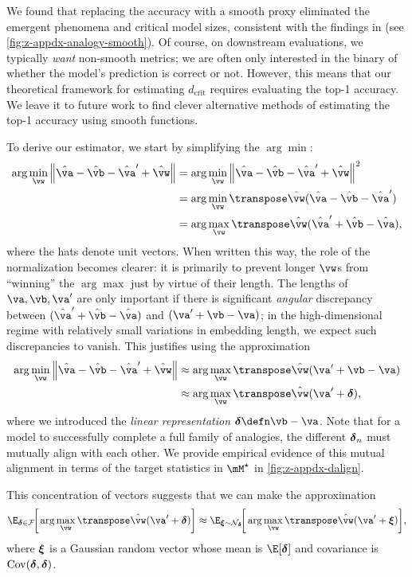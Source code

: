 We found that replacing the accuracy with a smooth proxy eliminated the emergent phenomena and critical model sizes, consistent with the findings in \cite{schaeffer2024emergent} (see \cref{fig:z-appdx-analogy-smooth}). Of course, on downstream evaluations, we typically \textit{want} non-smooth metrics; we are often only interested in the binary of whether the model's prediction is correct or not. However, this means that our theoretical framework for estimating $d_\mathrm{crit}$ requires evaluating the top-1 accuracy. We leave it to future work to find clever alternative methods of estimating the top-1 accuracy using smooth functions.

To derive our estimator, we start by simplifying the $\arg\min$:
\begin{align}
    \arg\min_{\vw} \left\lVert \hat\va - \hat\vb -\hat\va' +\hat\vw\right\rVert
    &= \arg\min_{\vw} \left\lVert \hat\va - \hat\vb -\hat\va' +\hat\vw\right\rVert^2 \\
    &= \arg\min_{\vw} \T{\hat\vw} (\hat\va - \hat\vb -\hat\va') \\ 
    &= \arg\max_{\vw} \T{\hat\vw} (\hat\va' + \hat\vb -\hat\va) ,
\end{align}
where the hats denote unit vectors. When written this way, the role of the normalization becomes clearer: it is primarily to prevent longer $\vw$s from ``winning'' the $\arg\max$ just by virtue of their length. The lengths of $\va, \vb, \va'$ are only important if there is significant \textit{angular} discrepancy between $(\hat\va' + \hat\vb -\hat\va)$ and $(\va' + \vb - \va)$; in the high-dimensional regime with relatively small variations in embedding length, we expect such discrepancies to vanish. This justifies using the approximation
\begin{align}
    \arg\min_{\vw} \left\lVert \hat\va - \hat\vb -\hat\va' +\hat\vw\right\rVert
    &\approx \arg\max_{\vw} \T{\hat\vw} (\va' + \vb - \va)\\ 
    &\approx \arg\max_{\vw} \T{\hat\vw} (\va' + \vdelta),
\end{align}
where we introduced the \textit{linear representation} $\vdelta\defn \vb-\va$. Note that for a model to successfully complete a full family of analogies, the different $\boldsymbol{\delta}_n$ must mutually align with each other. We provide empirical evidence of this mutual alignment in terms of the target statistics in $\Mstar$ in \cref{fig:z-appdx-dalign}.

This concentration of vectors suggests that we can make the approximation
\begin{equation}
    \E_{\vdelta\in\mathcal{F}} \!\bigg[\arg\max_{\vw} \T{\hat\vw} (\va' + \vdelta) \bigg] \approx
    \E_{\vxi\sim\mathcal{N}_{\vdelta}} \!\bigg[\arg\max_{\vw} \T{\hat\vw} (\va' + \vxi) \bigg],
\end{equation}
where $\boldsymbol{\xi}$ is a Gaussian random vector whose mean is $\E[\vdelta]$ and covariance is $\mathrm{Cov}(\boldsymbol{\delta}, \boldsymbol{\delta})$.

